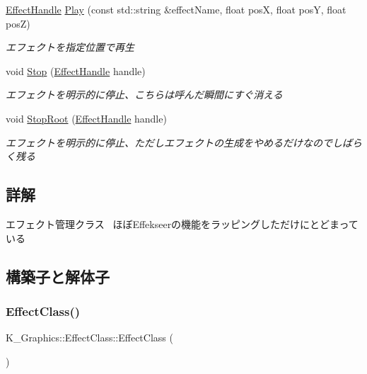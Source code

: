 \begin{DoxyCompactItemize}
\mbox{\hyperlink{namespace_k___graphics_afb3a0fd0adc77eb95104e697c9b6b7a9}{Effect\+Handle}} \mbox{\hyperlink{class_k___graphics_1_1_effect_class_ab9559608debb6f33a0c92b5886eecada}{Play}} (const std\+::string \&effect\+Name, float posX, float posY, float posZ)
\begin{DoxyCompactList}\small\item\em エフェクトを指定位置で再生 \end{DoxyCompactList}\item 
void \mbox{\hyperlink{class_k___graphics_1_1_effect_class_aeeb968f668c73b1ffff7679c99328b45}{Stop}} (\mbox{\hyperlink{namespace_k___graphics_afb3a0fd0adc77eb95104e697c9b6b7a9}{Effect\+Handle}} handle)
\begin{DoxyCompactList}\small\item\em エフェクトを明示的に停止、こちらは呼んだ瞬間にすぐ消える \end{DoxyCompactList}\item 
void \mbox{\hyperlink{class_k___graphics_1_1_effect_class_a16c4d3b8ab2775a782748ea409d2de2d}{Stop\+Root}} (\mbox{\hyperlink{namespace_k___graphics_afb3a0fd0adc77eb95104e697c9b6b7a9}{Effect\+Handle}} handle)
\begin{DoxyCompactList}\small\item\em エフェクトを明示的に停止、ただしエフェクトの生成をやめるだけなのでしばらく残る \end{DoxyCompactList}\end{DoxyCompactItemize}


\subsection{詳解}
エフェクト管理クラス~\newline
ほぼ\+Effekseerの機能をラッピングしただけにとどまっている 

\subsection{構築子と解体子}
\mbox{\label{class_k___graphics_1_1_effect_class_a33755c964db87d459d46c28788b19dd2}} 
\subsubsection{\texorpdfstring{Effect\+Class()}{EffectClass()}}
{\footnotesize\ttfamily K\+\_\+\+Graphics\+::\+Effect\+Class\+::\+Effect\+Class (\begin{DoxyParamCaption}{ }\end{DoxyParamCaption})}



